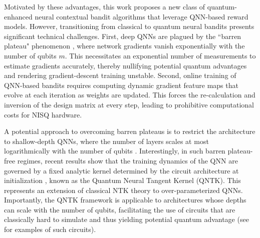 \documentclass[pdflatex,sn-mathphys-num]{sn-jnl}%
\theoremstyle{thmstyleone}%
\theoremstyle{thmstyletwo}%
\theoremstyle{thmstylethree}%
\begin{document}
Motivated by these advantages, this work proposes a new class of quantum-enhanced neural contextual bandit algorithms that leverage QNN-based reward models. However, transitioning from classical to quantum neural bandits presents significant technical challenges. First, deep QNNs are plagued by the ``barren plateau" phenomenon \cite{mcclean2018barren}, where network gradients vanish exponentially with the number of qubits $m$. This necessitates an exponential number of measurements to estimate gradients accurately, thereby nullifying potential quantum advantages and rendering gradient-descent training unstable. Second, online training of QNN-based bandits requires computing dynamic gradient feature maps that evolve at each iteration as weights are updated. This forces the re-calculation and inversion of the design matrix at every step, leading to prohibitive computational costs for NISQ hardware.


A potential approach to overcoming barren plateaus is to restrict the architecture to shallow-depth QNNs, where the number of layers scales at most logarithmically with the number of qubits \cite{napp2022quantifying}. Interestingly, in such barren plateau-free regimes, recent results show that the training dynamics of the QNN are governed by a fixed analytic kernel determined by the circuit architecture at initialization \cite{abedi2023quantum,Girardi2025}, known as the Quantum Neural Tangent Kernel (QNTK). This represents an extension of classical NTK theory to over-parameterized QNNs. Importantly, the QNTK framework is applicable to  architectures whose depths can scale with the number of qubits, facilitating the use of circuits that are classically hard to simulate and thus yielding potential quantum advantage (see \cite[Section 2.5]{Girardi2025} for examples of such circuits). 
\end{document}
